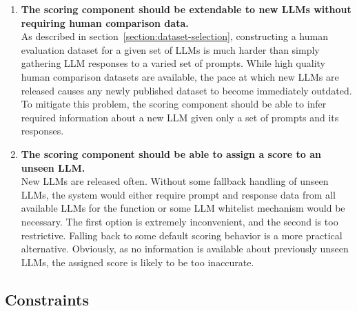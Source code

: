 \documentclass[a4paper,11pt,twoside]{report}
\theoremstyle{definition}
\begin{document}
\begin{enumerate}
    To be able to learn and utilize domain-specific LLM strengths, scoring must be performed in a prompt-aware way.
    \item \textbf{The scoring component should be extendable to new LLMs without requiring human comparison data.} \\
    As described in section~\ref{section:dataset-selection}, constructing a human evaluation dataset for a given set of LLMs is much harder than simply gathering LLM responses to a varied set of prompts. While high quality human comparison datasets are available, the pace at which new LLMs are released causes any newly published dataset to become immediately outdated. To mitigate this problem, the scoring component should be able to infer required information about a new LLM given only a set of prompts and its responses.
    \item \textbf{The scoring component should be able to assign a score to an unseen LLM.} \\
    New LLMs are released often. Without some fallback handling of unseen LLMs, the system would either require prompt and response data from all available LLMs for the function or some LLM whitelist mechanism would be necessary. The first option is extremely inconvenient, and the second is too restrictive. Falling back to some default scoring behavior is a more practical alternative. Obviously, as no information is available about previously unseen LLMs, the assigned score is likely to be too inaccurate.
\end{enumerate}

\subsection{Constraints}
\end{document}
